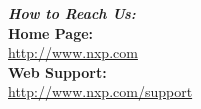 \begin{flushleft}\textbf{\textsf{\slshape{How to Reach Us\-:}}}\\[6pt]
\textbf{\textsf{Home Page\-:}}\\
\url{http://www.nxp.com} \\[6pt]
\textbf{\textsf{Web Support\-:}}\\
\url{http://www.nxp.com/support}
\end{flushleft}